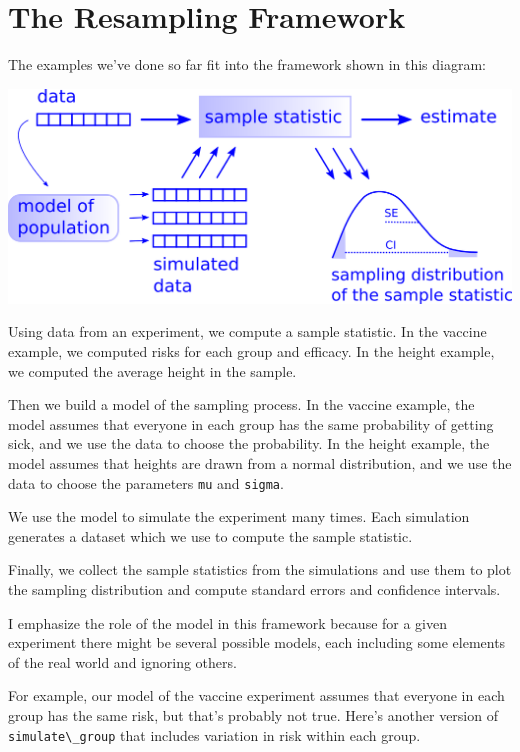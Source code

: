 \hypertarget{the-resampling-framework}{%
\section{The Resampling Framework}\label{the-resampling-framework}}

The examples we've done so far fit into the framework shown in this
diagram:

\includegraphics{figs/resampling.png}

Using data from an experiment, we compute a sample statistic. In the
vaccine example, we computed risks for each group and efficacy. In the
height example, we computed the average height in the sample.

Then we build a model of the sampling process. In the vaccine example,
the model assumes that everyone in each group has the same probability
of getting sick, and we use the data to choose the probability. In the
height example, the model assumes that heights are drawn from a normal
distribution, and we use the data to choose the parameters
\passthrough{\lstinline!mu!} and \passthrough{\lstinline!sigma!}.

We use the model to simulate the experiment many times. Each simulation
generates a dataset which we use to compute the sample statistic.

Finally, we collect the sample statistics from the simulations and use
them to plot the sampling distribution and compute standard errors and
confidence intervals.

I emphasize the role of the model in this framework because for a given
experiment there might be several possible models, each including some
elements of the real world and ignoring others.

For example, our model of the vaccine experiment assumes that everyone
in each group has the same risk, but that's probably not true. Here's
another version of \passthrough{\lstinline!simulate\_group!} that
includes variation in risk within each group.


